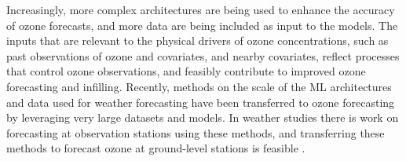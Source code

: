 \documentclass[gmd, manuscript]{copernicus}
\begin{document}
Increasingly, more complex architectures are being used to enhance the accuracy of ozone forecasts, and more data are being included as input to the models. The inputs that are relevant to the physical drivers of ozone concentrations, such as past observations of ozone and covariates, and nearby covariates, reflect processes that control ozone observations, and feasibly contribute to improved ozone forecasting and infilling. Recently, methods on the scale of the ML architectures and data used for weather forecasting \citep{bi_accurate_2023, lam_learning_2023} have been transferred to ozone forecasting by leveraging very large datasets and models. In weather studies there is work on forecasting at observation stations using these methods, and transferring these methods to forecast ozone at ground-level stations is feasible \citep{manshausen_generative_2024}. 



\end{document}
